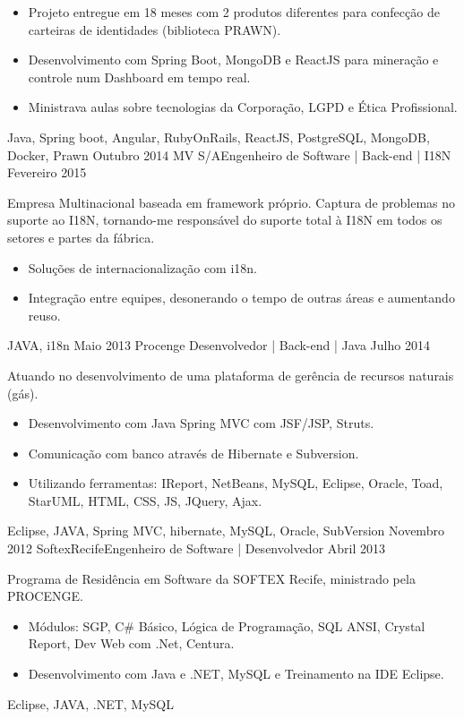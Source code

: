 \begin{experiences}
{\begin{itemize}
                       \item Projeto entregue em 18 meses com 2 produtos diferentes para confecção de carteiras de identidades (biblioteca PRAWN).
                       \item Desenvolvimento com Spring Boot, MongoDB e ReactJS para mineração e controle num Dashboard em tempo real.
                       \item Ministrava aulas sobre tecnologias da Corporação, LGPD e Ética Profissional.
                      \end{itemize}
                    }
                    {Java, Spring boot, Angular, RubyOnRails, ReactJS, PostgreSQL, MongoDB, Docker, Prawn}
  \emptySeparator
  \experience
        {Outubro 2014} {MV S/A}{Engenheiro de Software | Back-end | I18N}{}
        {Fevereiro 2015} { Empresa Multinacional baseada em framework próprio. Captura de problemas no suporte ao I18N, tornando-me responsável do suporte total à I18N em todos os setores e partes da fábrica.
                    \begin{itemize}
                        \item Soluções de internacionalização com i18n.
                        \item Integração entre equipes, desonerando o tempo de outras áreas e aumentando reuso.
                    \end{itemize}
                    }
                    {JAVA, i18n}
  \emptySeparator
 \experience
        {Maio 2013}   {Procenge }{Desenvolvedor | Back-end | Java}{}
        {Julho 2014} { Atuando no desenvolvimento de uma plataforma de gerência de recursos naturais (gás).
                \begin{itemize}
                    \item Desenvolvimento com Java Spring MVC com JSF/JSP, Struts.
                    \item Comunicação com banco através de Hibernate e Subversion.
                    \item Utilizando ferramentas: IReport, NetBeans, MySQL, Eclipse, Oracle, Toad, StarUML, HTML, CSS, JS, JQuery, Ajax.
                    \end{itemize}
                }
                {Eclipse, JAVA, Spring MVC, hibernate, MySQL, Oracle, SubVersion }
  \emptySeparator
  \experience
        {Novembro 2012} {SoftexRecife}{Engenheiro de Software | Desenvolvedor}{}
        {Abril 2013}{ Programa de Residência em Software da SOFTEX Recife, ministrado pela PROCENGE.
                        \begin{itemize}
                            \item Módulos: SGP, C\# Básico, Lógica de Programação, SQL ANSI, Crystal Report, Dev Web com .Net, Centura.
                            \item Desenvolvimento com Java e .NET, MySQL e Treinamento na IDE Eclipse.
                        \end{itemize}
                    }
                    {Eclipse, JAVA, .NET, MySQL}
    \emptySeparator
\end{experiences}
